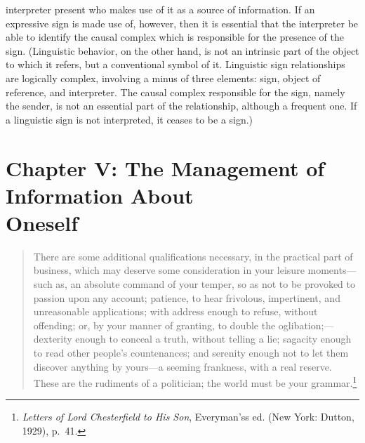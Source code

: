 \documentclass[openany,nobib]{tufte-book}
\let\oldchapter\chapter
\def\chapter{%
  \setcounter{footnote}{0}%
  \oldchapter
}
\begin{document}
\begin{enumerate}
  interpreter present who makes use of it as a source of information. If
  an expressive sign is made use of, however, then it is essential that
  the interpreter be able to identify the causal complex which is
  responsible for the presence of the sign. (Linguistic behavior, on the
  other hand, is not an intrinsic part of the object to which it refers,
  but a conventional symbol of it. Linguistic sign relationships are
  logically complex, involving a minus of three elements: sign, object
  of reference, and interpreter. The causal complex responsible for the
  sign, namely the sender, is not an essential part of the relationship,
  although a frequent one. If a linguistic sign is not interpreted, it
  ceases to be a sign.)
\end{enumerate}


\chapter[CHAPTER V: THE MANAGEMENT OF INFORMATION ABOUT ONESELF]{Chapter V: The Management of Information About\\ Oneself}
\label{ch:Chapter V: The Management of Information About Oneself}

\begin{quote}
There are some additional qualifications necessary, in the practical
part of business, which may deserve some con­sideration in your leisure
moments---such as, an absolute command of your temper, so as not to be
provoked to passion upon any account; patience, to hear frivolous,
impertinent, and unreasonable applications; with address enough to
re­fuse, without offending; or, by your manner of granting, to double the
oglibation;---dexterity enough to conceal a truth, without telling a
lie; sagacity enough to read other people's countenances; and serenity
enough not to let them discover anything by yours---a seeming frankness,
with a real reserve. These are the rudiments of a politician; the world
must be your grammar.\footnote{\emph{Letters of Lord Chesterfield to His
  Son}, Everyman'ss ed. (New York: Dutton, 1929), p.~41.}
\end{quote}
\end{document}
